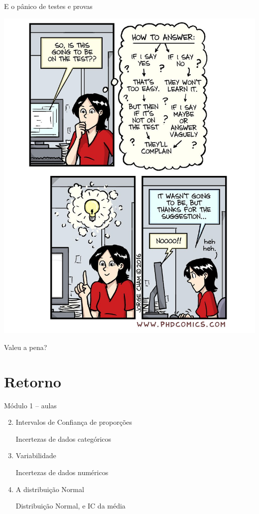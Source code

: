 \documentclass{beamer}
\begin{document}
\begin{frame}{\scriptsize E o pânico de testes e provas}
  \begin{center}
    \includegraphics[height=.8\textheight]{Encerramento/phdcomics-teste}

    \vfill
  \end{center}
\end{frame}

\begin{frame}
  \begin{center}
    Valeu a pena?

    \vfill
  \end{center}
\end{frame}

\section{Retorno}

\begin{frame}{\scriptsize Módulo 1 -- aulas}
  \begin{enumerate}
    \setcounter{enumi}{1}
  \item Intervalos de Confiança de proporções

    {\tiny Incertezas de dados categóricos}
    \bigskip
  \item Variabilidade

    {\tiny Incertezas de dados numéricos}
    \bigskip
  \item A distribuição Normal

    {\tiny Distribuição Normal, e IC da média}
  \end{enumerate}
\end{frame}
\end{document}
